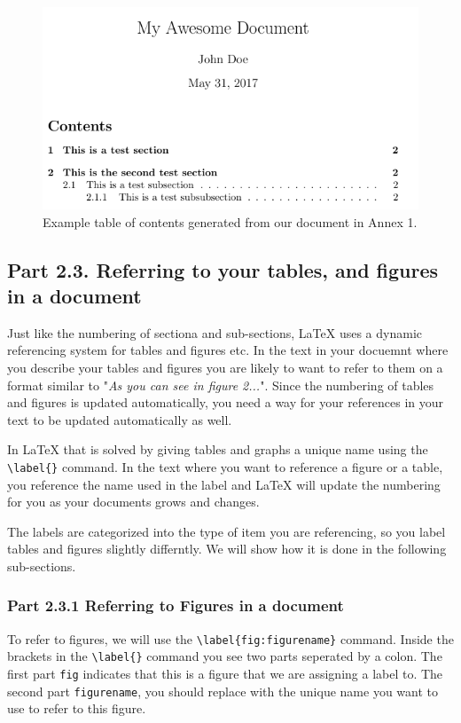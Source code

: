 \documentclass[12pts]{report}
\begin{document}
\begin{figure} [H]
	\centering
	\includegraphics[width=.8\linewidth]{../img/tableofcontents2}
	\caption{Example table of contents generated from our document in Annex 1.}
	\label{fig:tableofcontents}
\end{figure}

\subsection*{Part 2.3. Referring to your tables, and figures in a document}

Just like the numbering of sectiona and sub-sections, {\LaTeX} uses a dynamic referencing system for tables and figures etc. In the text in your docuemnt where you describe your tables and figures you are likely to want to refer to them on a format similar to "\textit{As you can see in figure 2...}". Since the numbering of tables and figures is updated automatically, you need a way for your references in your text to be updated automatically as well.

In {\LaTeX} that is solved by giving tables and graphs a unique name using the \verb|\label{}| command. In the text where you want to reference a figure or a table, you reference the name used in the label and {\LaTeX} will update the numbering for you as your documents grows and changes.

The labels are categorized into the type of item you are referencing, so you label tables and figures slightly differntly. We will show how it is done in the following sub-sections.

\subsubsection*{Part 2.3.1 Referring to Figures in a document}
To refer to figures, we will use the \verb|\label{fig:figurename}| command. Inside the brackets in the \verb|\label{}| command you see two parts seperated by a colon. The first part  \texttt{fig} indicates that this is a figure that we are assigning a label to. The second part  \texttt{figurename}, you should replace with the unique name you want to use to refer to this figure.
  
\end{document}
